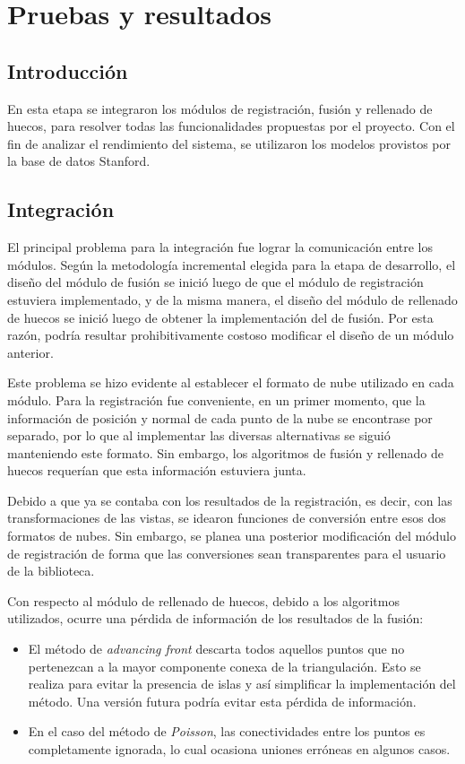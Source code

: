 \chapter{Pruebas y resultados}
	\section{Introducción}
	En esta etapa se integraron los módulos de registración, fusión y rellenado de huecos,
	para resolver todas las funcionalidades propuestas por el proyecto.
	Con el fin de analizar el rendimiento del sistema,
	se utilizaron los modelos provistos por la base de datos Stanford.

	\section{Integración}
		El principal problema para la integración fue lograr la comunicación
		entre los módulos.  Según la metodología incremental elegida para la
		etapa de desarrollo, el diseño del módulo de fusión se inició luego de
		que el módulo de registración estuviera implementado, y de la misma
		manera, el diseño del módulo de rellenado de huecos se inició luego de
		obtener la implementación del de fusión. 
		Por esta razón, podría resultar prohibitivamente costoso modificar el diseño de un módulo anterior.

		Este problema se hizo evidente al establecer el formato de nube utilizado en cada módulo.
		Para la registración fue conveniente, en un primer momento,
		que la información de posición y normal de cada punto de la nube se encontrase por separado,
		por lo que al implementar las diversas alternativas se siguió manteniendo este formato.
		Sin embargo, los algoritmos de fusión y rellenado de huecos requerían
		que esta información estuviera junta.

		Debido a que ya se contaba con los resultados de la registración, es
		decir, con las transformaciones de las vistas, se idearon funciones de
		conversión entre esos dos formatos de nubes.
		Sin embargo, se planea una posterior modificación del módulo de registración de
		forma que las conversiones sean transparentes para el usuario de la
		biblioteca.

		Con respecto al módulo de rellenado de huecos, debido a los algoritmos
		utilizados, ocurre una pérdida de información de los resultados de la
		fusión:
		\begin{itemize}
			\item El método de \emph{advancing front} descarta todos aquellos
				puntos que no pertenezcan a la mayor componente conexa de la
				triangulación. Esto se realiza para evitar la presencia de islas y así
				simplificar la implementación del método.
				Una versión futura podría evitar esta pérdida de información.

			\item En el caso del método de \emph{Poisson}, las conectividades entre los
				puntos es completamente ignorada, lo cual ocasiona uniones erróneas en algunos casos.
		\end{itemize}


